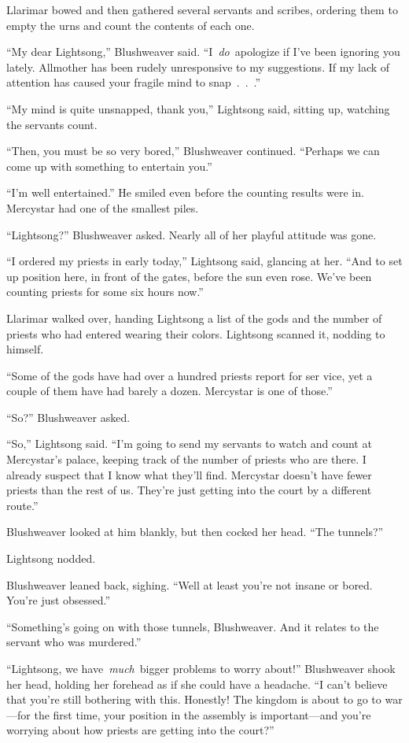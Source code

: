 Llarimar bowed and then gathered several servants and scribes, ordering them to empty the urns and count the contents of each one.

“My dear Lightsong,” Blushweaver said. “I~\textit{do}~apologize if I’ve been ignoring you lately. Allmother has been rudely unresponsive to my suggestions. If my lack of attention has caused your fragile mind to snap~.~.~.”

“My mind is quite unsnapped, thank you,” Lightsong said, sitting up, watching the servants count.

“Then, you must be so very bored,” Blushweaver continued. “Perhaps we can come up with something to entertain you.”

“I’m well entertained.” He smiled even before the counting results were in. Mercystar had one of the smallest piles.

“Lightsong?” Blushweaver asked. Nearly all of her playful attitude was gone.

“I ordered my priests in early today,” Lightsong said, glancing at her. “And to set up position here, in front of the gates, before the sun even rose. We’ve been counting priests for some six hours now.”

Llarimar walked over, handing Lightsong a list of the gods and the number of priests who had entered wearing their colors. Lightsong scanned it, nodding to himself.

“Some of the gods have had over a hundred priests report for ser vice, yet a couple of them have had barely a dozen. Mercystar is one of those.”

“So?” Blushweaver asked.

“So,” Lightsong said. “I’m going to send my servants to watch and count at Mercystar’s palace, keeping track of the number of priests who are there. I already suspect that I know what they’ll find. Mercystar doesn’t have fewer priests than the rest of us. They’re just getting into the court by a different route.”

Blushweaver looked at him blankly, but then cocked her head. “The tunnels?”

Lightsong nodded.

Blushweaver leaned back, sighing. “Well at least you’re not insane or bored. You’re just obsessed.”

“Something’s going on with those tunnels, Blushweaver. And it relates to the servant who was murdered.”

“Lightsong, we have~\textit{much}~bigger problems to worry about!” Blushweaver shook her head, holding her forehead as if she could have a headache. “I can’t believe that you’re still bothering with this. Honestly! The kingdom is about to go to war—for the first time, your position in the assembly is important—and you’re worrying about how priests are getting into the court?”

